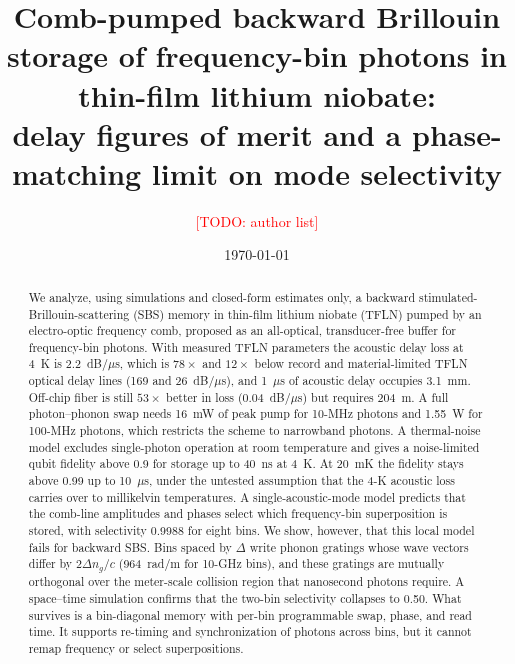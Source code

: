 \documentclass[reprint,amsmath,amssymb,aps,prapplied,superscriptaddress,floatfix]{revtex4-2}
\newcommand{\todo}[1]{\textcolor{red}{[TODO: #1]}}
\newcommand{\dBus}{dB/$\mu$s}
\begin{document}
\title{Comb-pumped backward Brillouin storage of frequency-bin photons in thin-film lithium niobate:\\ delay figures of merit and a phase-matching limit on mode selectivity}

\author{\todo{author list}}
\affiliation{\todo{affiliations}}

\date{\today}

\begin{abstract}
We analyze, using simulations and closed-form estimates only, a backward stimulated-Brillouin-scattering (SBS) memory in thin-film lithium niobate (TFLN) pumped by an electro-optic frequency comb, proposed as an all-optical, transducer-free buffer for frequency-bin photons. With measured TFLN parameters the acoustic delay loss at 4~K is 2.2~\dBus{}, which is $78\times$ and $12\times$ below record and material-limited TFLN optical delay lines (169 and 26~\dBus{}), and 1~$\mu$s of acoustic delay occupies 3.1~mm. Off-chip fiber is still $53\times$ better in loss (0.04~\dBus{}) but requires 204~m. A full photon--phonon swap needs 16~mW of peak pump for 10-MHz photons and 1.55~W for 100-MHz photons, which restricts the scheme to narrowband photons. A thermal-noise model excludes single-photon operation at room temperature and gives a noise-limited qubit fidelity above 0.9 for storage up to 40~ns at 4~K. At 20~mK the fidelity stays above 0.99 up to 10~$\mu$s, under the untested assumption that the 4-K acoustic loss carries over to millikelvin temperatures. A single-acoustic-mode model predicts that the comb-line amplitudes and phases select which frequency-bin superposition is stored, with selectivity 0.9988 for eight bins. We show, however, that this local model fails for backward SBS. Bins spaced by $\Delta$ write phonon gratings whose wave vectors differ by $2\Delta n_g/c$ (964~rad/m for 10-GHz bins), and these gratings are mutually orthogonal over the meter-scale collision region that nanosecond photons require. A space--time simulation confirms that the two-bin selectivity collapses to 0.50. What survives is a bin-diagonal memory with per-bin programmable swap, phase, and read time. It supports re-timing and synchronization of photons across bins, but it cannot remap frequency or select superpositions.
\end{abstract}

\maketitle
\end{document}
